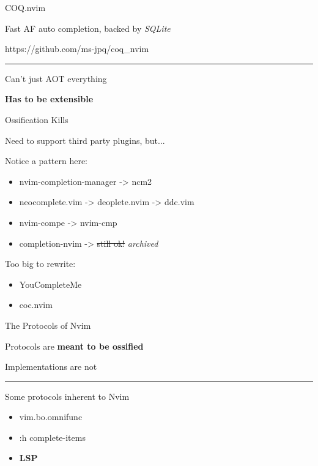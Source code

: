 \documentclass{beamer}
\begin{document}
\begin{frame}{COQ.nvim}

	Fast AF auto completion, backed by \textit{SQLite}

	https://github.com/ms-jpq/coq\_nvim

	\rule{\textwidth}{0.1em}

	Can't just AOT everything

	\textbf{Has to be extensible}

\end{frame}


\begin{frame}{Ossification Kills}

	Need to support third party plugins, but...

	Notice a pattern here:

	\begin{itemize}

		\item nvim-completion-manager -> ncm2

		\item neocomplete.vim -> deoplete.nvim -> ddc.vim

		\item nvim-compe -> nvim-cmp

		\item completion-nvim -> \st{still ok!} \textit{archived}

	\end{itemize}

	Too big to rewrite:

	\begin{itemize}

		\item YouCompleteMe

		\item coc.nvim

	\end{itemize}

\end{frame}


\begin{frame}{The Protocols of Nvim}

	Protocols are \textbf{meant to be ossified}

	Implementations are not

	\rule{\textwidth}{0.1em}

	Some protocols inherent to Nvim

	\begin{itemize}

		\item vim.bo.omnifunc

		\item :h complete-items

		\item \textbf{LSP}

	\end{itemize}

\end{frame}
\end{document}
